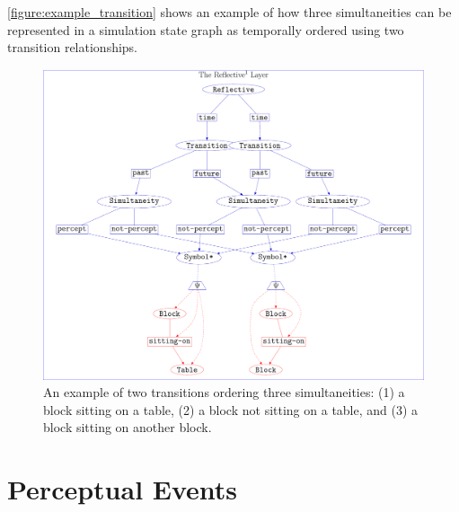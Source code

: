 {\mbox{\autoref{figure:example_transition}}} shows an example of how
three simultaneities can be represented in a simulation state graph as
temporally ordered using two transition relationships.
\begin{figure}
\center
\includegraphics[width=14cm]{gfx/example_transition}
\caption[An example of two transitions ordering three
  simultaneities.]{An example of two transitions ordering three
  simultaneities: (1) a block sitting on a table, (2) a block not
  sitting on a table, and (3) a block sitting on another block.}
\label{figure:example_transition}
\end{figure}

\section{Perceptual Events}

